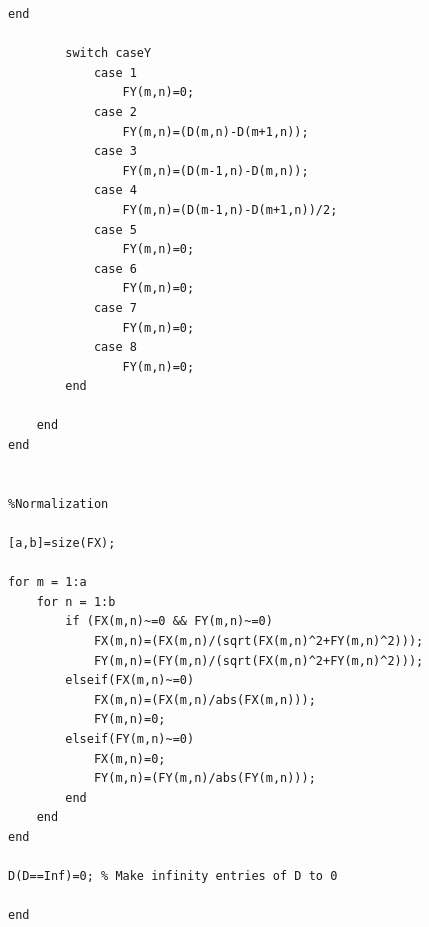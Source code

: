 \documentclass[11pt]{article}
\begin{document}
\begin{lstlisting}[frame=lines]
        end 
        
        switch caseY
            case 1 
                FY(m,n)=0;
            case 2 
                FY(m,n)=(D(m,n)-D(m+1,n));
            case 3 
                FY(m,n)=(D(m-1,n)-D(m,n));
            case 4 
                FY(m,n)=(D(m-1,n)-D(m+1,n))/2;
            case 5
                FY(m,n)=0;
            case 6 
                FY(m,n)=0;
            case 7
                FY(m,n)=0;
            case 8 
                FY(m,n)=0;
        end

    end
end


%Normalization

[a,b]=size(FX);

for m = 1:a
    for n = 1:b
        if (FX(m,n)~=0 && FY(m,n)~=0)
            FX(m,n)=(FX(m,n)/(sqrt(FX(m,n)^2+FY(m,n)^2)));
            FY(m,n)=(FY(m,n)/(sqrt(FX(m,n)^2+FY(m,n)^2)));
        elseif(FX(m,n)~=0)
            FX(m,n)=(FX(m,n)/abs(FX(m,n)));
            FY(m,n)=0;
        elseif(FY(m,n)~=0)
            FX(m,n)=0;
            FY(m,n)=(FY(m,n)/abs(FY(m,n)));
        end
    end
end

D(D==Inf)=0; % Make infinity entries of D to 0

end
\end{lstlisting}
\end{document}
